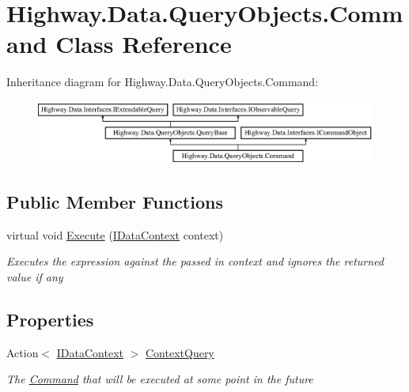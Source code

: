 \hypertarget{class_highway_1_1_data_1_1_query_objects_1_1_command}{\section{Highway.\-Data.\-Query\-Objects.\-Command Class Reference}
\label{class_highway_1_1_data_1_1_query_objects_1_1_command}
}


 


Inheritance diagram for Highway.\-Data.\-Query\-Objects.\-Command\-:\begin{figure}[H]
\begin{center}
\leavevmode
\includegraphics[height=2.089552cm]{class_highway_1_1_data_1_1_query_objects_1_1_command}
\end{center}
\end{figure}
\subsection*{Public Member Functions}
\begin{DoxyCompactItemize}
\item 
virtual void \hyperlink{class_highway_1_1_data_1_1_query_objects_1_1_command_a7154a6a32966d8f54a31860d8c829820}{Execute} (\hyperlink{interface_highway_1_1_data_1_1_interfaces_1_1_i_data_context}{I\-Data\-Context} context)
\begin{DoxyCompactList}\small\item\em Executes the expression against the passed in context and ignores the returned value if any \end{DoxyCompactList}\end{DoxyCompactItemize}
\subsection*{Properties}
\begin{DoxyCompactItemize}
\item 
Action$<$ \hyperlink{interface_highway_1_1_data_1_1_interfaces_1_1_i_data_context}{I\-Data\-Context} $>$ \hyperlink{class_highway_1_1_data_1_1_query_objects_1_1_command_a83c9845e7df1f9ff350d05182c23e373}{Context\-Query}
\begin{DoxyCompactList}\small\item\em The \hyperlink{class_highway_1_1_data_1_1_query_objects_1_1_command}{Command} that will be executed at some point in the future \end{DoxyCompactList}\end{DoxyCompactItemize}

